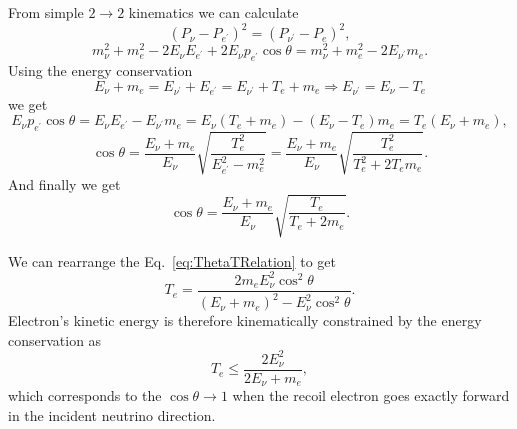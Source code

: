 From simple $2\rightarrow 2$ kinematics we can calculate
\begin{equation}
\left(P_{\nu}-P_{e^{\prime}}\right)^2=\left(P_{\nu^{\prime}}-P_e\right)^2,
\end{equation}
\begin{equation}
m_{\nu}^2+m_e^2-2E_{\nu}E_{e^{\prime}}+2E_{\nu}p_{e^{\prime}}\cos\theta=m_{\nu}^2+m_e^2-2E_{\nu^{\prime}}m_e.
\end{equation}
Using the energy conservation
\begin{equation}
E_{\nu}+m_e=E_{\nu^{\prime}}+E_{e^{\prime}}=E_{\nu^{\prime}}+T_e+m_e\Rightarrow E_{\nu^{\prime}}=E_{\nu}-T_e
\end{equation}
we get
\begin{equation}
E_{\nu}p_{e^{\prime}}\cos\theta=E_{\nu}E_{e^{\prime}}-E_{\nu^{\prime}}m_e=E_{\nu}\left(T_e+m_e\right)-\left(E_{\nu}-T_e\right)m_e=T_e\left(E_{\nu}+m_e\right),
\end{equation}
\begin{equation}
\cos\theta=\frac{E_{\nu}+m_e}{E_{\nu}}\sqrt{\frac{T_e^2}{E_{e^{\prime}}^2-m_e^2}}=\frac{E_{\nu}+m_e}{E_{\nu}}\sqrt{\frac{T_e^2}{T_e^2+2T_em_e}}.
\end{equation}
And finally we get
\begin{equation}\label{eq:ThetaTRelation}
\cos\theta=\frac{E_{\nu}+m_e}{E_{\nu}}\sqrt{\frac{T_e}{T_e+2m_e}}.
\end{equation}

We can rearrange the Eq.~\ref{eq:ThetaTRelation} to get
\begin{equation}\label{eq:TThetaRelation}
T_e=\frac{2m_eE_\nu^2\cos^2\theta}{\left(E_\nu+m_e\right)^2-E_\nu^2\cos^2\theta}.
\end{equation}
Electron's kinetic energy is therefore kinematically constrained by the energy conservation as
\begin{equation}
T_e\leq\frac{2E_{\nu}^2}{2E_{\nu}+m_e},
\end{equation}
which corresponds to the $\cos\theta\rightarrow 1$ when the recoil electron goes exactly forward in the incident neutrino direction.

